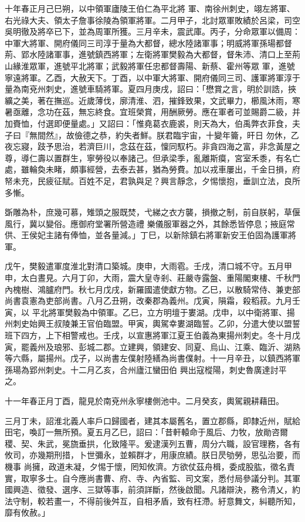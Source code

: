 \begin{pinyinscope}
 十年春正月己巳朔，以中領軍廬陵王伯仁為平北將
 軍、南徐州刺史，翊左將軍、右光祿大夫、領太子詹事徐陵為領軍將軍。二月甲子，北討眾軍敗績於呂梁，司空吳明徹及將卒已下，並為周軍所獲。三月辛未，震武庫。丙子，分命眾軍以備周：中軍大將軍、開府儀同三司淳于量為大都督，總水陸諸軍事；明威將軍孫瑒都督荊、郢水陸諸軍事，進號鎮西將軍；左衛將軍樊毅為大都督，督朱沛、清口上至荊山緣淮眾軍，進號平北將軍；武毅將軍任忠都督壽陽、新蔡、霍州等眾
 軍，進號寧遠將軍。乙酉，大赦天下。丁酉，以中軍大將軍、開府儀同三司、護軍將軍淳于量為南兗州刺史，進號車騎將軍。夏四月庚戌，詔曰：「懋賞之言，明於訓誥，挾纊之美，著在撫巡。近歲薄伐，廓清淮、泗，摧鋒致果，文武畢力，櫛風沐雨，寒暑亟離，念功在茲，無忘終食。宜班榮賞，用酬厥勞。應在軍者可並賜爵二級，并加賚恤，付選即便量處。」又詔曰：「惟堯葛衣鹿裘，則天為大，伯禹弊衣菲食，夫子曰『無間然』，故儉德之恭，約失者鮮。朕君臨宇宙，十變年籥，旰日
 勿休，乙夜忘寢，跂予思治，若濟巨川，念茲在茲，懍同馭朽。非貪四海之富，非念黃屋之尊，導仁壽以置群生，寧勞役以奉諸己。但承梁季，亂離斯瘼，宮室禾黍，有名亡處，雖輪奐未睹，頗事經營，去泰去甚，猶為勞費。加以戎車屢出，千金日損，府帑未充，民疲征賦。百姓不足，君孰與足？興言靜念，夕惕懷抱，垂訓立法，良所多慚。



 斲雕為朴，庶幾可慕，雉頭之服既焚，弋綈之衣方襲，損撤之制，前自朕躬，草偃風行，冀以變俗。應御府堂署所營造禮
 樂儀服軍器之外，其餘悉皆停息；掖庭常供、王侯妃主諸有俸恤，並各量減。」丁巳，以新除鎮右將軍新安王伯固為護軍將軍。



 戊午，樊毅遣軍度淮北對清口築城。庚申，大雨雹。壬戌，清口城不守。五月甲申，太白晝見。六月丁卯，大雨，震大皇寺剎、莊嚴寺露盤、重陽閣東樓、千秋門內槐樹、鴻臚府門。秋七月戊戌，新羅國遣使獻方物。乙巳，以散騎常侍、兼吏部尚書袁憲為吏部尚書。八月乙丑朔，改秦郡為義州。戊寅，隕霜，殺稻菽。九月壬寅，以
 平北將軍樊毅為中領軍。乙巳，立方明壇于婁湖。戊申，以中衛將軍、揚州刺史始興王叔陵兼王官伯臨盟。甲寅，輿駕幸婁湖臨誓。乙卯，分遣大使以盟誓班下四方，上下相警戒也。壬戌，以宣惠將軍江夏王伯義為東揚州刺史。冬十月戊寅，罷義州及琅邪、彭城二郡。立建興，領建安、同夏、烏山、江乘、臨沂、湖熟等六縣，屬揚州。戊子，以尚書左僕射陸繕為尚書僕射。十一月辛丑，以鎮西將軍孫瑒為郢州刺史。十二月乙亥，合州廬江蠻田伯
 興出寇樅陽，刺史魯廣達討平之。



 十一年春正月丁酉，龍見於南兗州永寧樓側池中。二月癸亥，輿駕親耕藉田。



 三月丁未，詔淮北義人率戶口歸國者，建其本屬舊名，置立郡縣，即隸近州，賦給田宅，喚訂一無所預。夏五月乙巳，詔曰：「昔軒轅命于風后、力牧，放勛咨爾稷、契、朱武，冕旒垂拱，化致隆平。爰逮漢列五曹，周分六職，設官理務，各有攸司，亦幾期刑措，卜世彌永，並賴群才，用康庶績。朕日昃劬勞，思弘治要，而機事
 尚擁，政道未凝，夕惕于懷，罔知攸濟。方欲仗茲舟楫，委成股肱，徵名責實，取寧多士。自今應尚書曹、府、寺、內省監、司文案，悉付局參議分判。其軍國興造、徵發、選序、三獄等事，前須詳斷，然後啟聞。凡諸辯決，務令清乂，約法守制，較若畫一，不得前後舛互，自相矛盾，致有枉滯。紆意舞文，糾聽所知，靡有攸赦。」




\end{pinyinscope}
